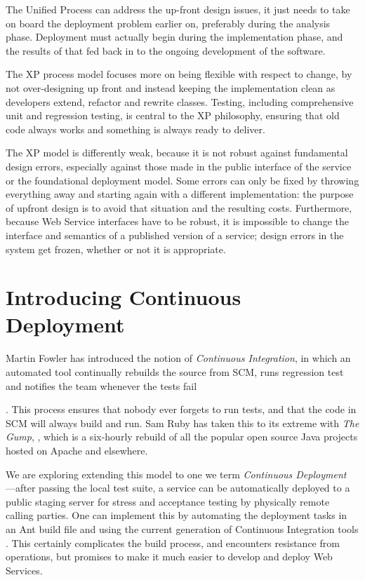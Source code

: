 \documentclass[draft]{report}
\begin{document}
The Unified Process can address the up-front design issues, it just
needs to take on board the deployment problem earlier on, preferably
during the analysis phase. Deployment must actually begin during the
implementation phase, and the results of that fed back in to the ongoing
development of the software.

The XP process model focuses more on being flexible with respect to
change, by not over-designing up front and instead keeping the
implementation clean as developers extend, refactor and rewrite classes.
Testing, including comprehensive unit and regression testing, is central
to the XP philosophy, ensuring that old code always works and something
is always ready to deliver.

The XP model is differently weak, because it is not robust against
fundamental design errors, especially against those made in the public
interface of the service or the foundational deployment model. Some
errors can only be fixed by throwing everything away and starting again
with a different implementation: the purpose of upfront design is to
avoid that situation and the resulting costs. Furthermore, because Web
Service interfaces have to be robust, it is impossible to change the
interface and semantics of a published version of a service; design
errors in the system get frozen, whether or not it is appropriate.

\section{Introducing Continuous Deployment}

Martin Fowler has introduced the notion of \emph{Continuous
Integration}, in which an automated tool continually rebuilds the source
from SCM, runs regression test and notifies the team whenever the tests
fail

\cite{fowler:cruisecontrol}. This process ensures that nobody ever
forgets to run tests, and that the code in SCM will always build and
run. Sam Ruby has taken this to its extreme with \emph{The Gump},
\cite{ruby:gump}, which is a six-hourly rebuild of all the popular open
source Java projects hosted on Apache and elsewhere.

We are exploring extending this model to one we term \emph{Continuous
Deployment} ---after passing the local test suite, a service can be
automatically deployed to a public staging server for stress and
acceptance testing by physically remote calling parties. One can
implement this by automating the deployment tasks in an Ant build file
and using the current generation of Continuous Integration tools
\cite{loughran:antbook,jakarta:ant1.5,app:anthill}. This certainly
complicates the build process, and encounters resistance from
operations, but promises to make it much easier to develop and deploy
Web Services. 
\end{document}
